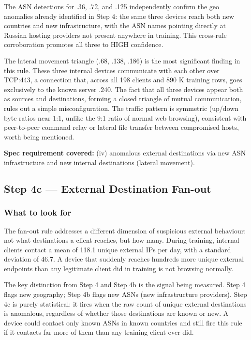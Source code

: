 \documentclass[
  11pt,
]{article}
\begin{document}
The ASN detections for .36, .72, and .125 independently confirm the geo
anomalies already identified in Step 4: the same three devices reach
both new countries and new infrastructure, with the ASN names pointing
directly at Russian hosting providers not present anywhere in training.
This cross-rule corroboration promotes all three to HIGH confidence.

The lateral movement triangle (.68, .138, .186) is the most significant
finding in this rule. These three internal devices communicate with each
other over TCP:443, a connection that, across all 198 clients
and 890 K training rows, goes exclusively to the known server .240. The
fact that all three devices appear both as sources and destinations,
forming a closed triangle of mutual communication, rules out a simple
misconfiguration. The traffic pattern is symmetric (up/down byte ratios
near 1:1, unlike the 9:1 ratio of normal web browsing), consistent with
peer-to-peer command relay or lateral file transfer between compromised
hosts, worth being mentioned.

\medskip
\noindent\colorbox{gray!12}{\parbox{\dimexpr\linewidth-2\fboxsep\relax}{\textbf{Spec requirement covered:} (iv) anomalous external destinations via new ASN infrastructure and new internal destinations (lateral movement).}}

\hypertarget{external-destination-fan-out}{%
\subsection{Step 4c — External Destination Fan-out}\label{external-destination-fan-out}}

\hypertarget{what-to-look-for-5}{%
\subsubsection{What to look for}\label{what-to-look-for-5}}

The fan-out rule addresses a different dimension of suspicious external
behaviour: not what destinations a client reaches, but how many. During
training, internal clients contact a mean of 118.1 unique external IPs
per day, with a standard deviation of 46.7. A device that suddenly
reaches hundreds more unique external endpoints than any legitimate
client did in training is not browsing normally.

The key distinction from Step 4 and Step 4b is the signal being
measured. Step 4 flags new geography; Step 4b flags new ASNs (new
infrastructure providers). Step 4c is purely statistical: it fires when
the raw count of unique external destinations is anomalous, regardless
of whether those destinations are known or new. A device could contact
only known ASNs in known countries and still fire this rule if it
contacts far more of them than any training client ever did.
\end{document}
